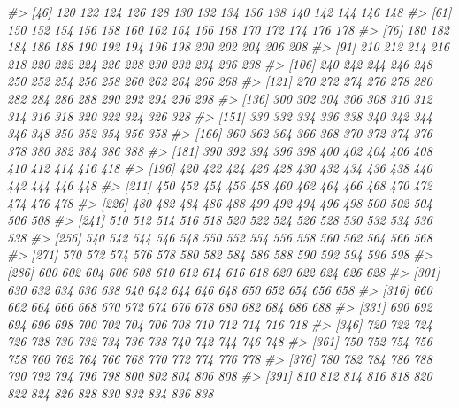 \documentclass[
]{article}
\newenvironment{Shaded}{\begin{snugshade}}{\end{snugshade}}
\newcommand{\CommentTok}[1]{\textcolor[rgb]{0.56,0.35,0.01}{\textit{#1}}}
\begin{document}
\begin{Shaded}
\begin{Highlighting}[]
\CommentTok{\#\textgreater{}  [46]  120  122  124  126  128  130  132  134  136  138  140  142  144  146  148}
\CommentTok{\#\textgreater{}  [61]  150  152  154  156  158  160  162  164  166  168  170  172  174  176  178}
\CommentTok{\#\textgreater{}  [76]  180  182  184  186  188  190  192  194  196  198  200  202  204  206  208}
\CommentTok{\#\textgreater{}  [91]  210  212  214  216  218  220  222  224  226  228  230  232  234  236  238}
\CommentTok{\#\textgreater{} [106]  240  242  244  246  248  250  252  254  256  258  260  262  264  266  268}
\CommentTok{\#\textgreater{} [121]  270  272  274  276  278  280  282  284  286  288  290  292  294  296  298}
\CommentTok{\#\textgreater{} [136]  300  302  304  306  308  310  312  314  316  318  320  322  324  326  328}
\CommentTok{\#\textgreater{} [151]  330  332  334  336  338  340  342  344  346  348  350  352  354  356  358}
\CommentTok{\#\textgreater{} [166]  360  362  364  366  368  370  372  374  376  378  380  382  384  386  388}
\CommentTok{\#\textgreater{} [181]  390  392  394  396  398  400  402  404  406  408  410  412  414  416  418}
\CommentTok{\#\textgreater{} [196]  420  422  424  426  428  430  432  434  436  438  440  442  444  446  448}
\CommentTok{\#\textgreater{} [211]  450  452  454  456  458  460  462  464  466  468  470  472  474  476  478}
\CommentTok{\#\textgreater{} [226]  480  482  484  486  488  490  492  494  496  498  500  502  504  506  508}
\CommentTok{\#\textgreater{} [241]  510  512  514  516  518  520  522  524  526  528  530  532  534  536  538}
\CommentTok{\#\textgreater{} [256]  540  542  544  546  548  550  552  554  556  558  560  562  564  566  568}
\CommentTok{\#\textgreater{} [271]  570  572  574  576  578  580  582  584  586  588  590  592  594  596  598}
\CommentTok{\#\textgreater{} [286]  600  602  604  606  608  610  612  614  616  618  620  622  624  626  628}
\CommentTok{\#\textgreater{} [301]  630  632  634  636  638  640  642  644  646  648  650  652  654  656  658}
\CommentTok{\#\textgreater{} [316]  660  662  664  666  668  670  672  674  676  678  680  682  684  686  688}
\CommentTok{\#\textgreater{} [331]  690  692  694  696  698  700  702  704  706  708  710  712  714  716  718}
\CommentTok{\#\textgreater{} [346]  720  722  724  726  728  730  732  734  736  738  740  742  744  746  748}
\CommentTok{\#\textgreater{} [361]  750  752  754  756  758  760  762  764  766  768  770  772  774  776  778}
\CommentTok{\#\textgreater{} [376]  780  782  784  786  788  790  792  794  796  798  800  802  804  806  808}
\CommentTok{\#\textgreater{} [391]  810  812  814  816  818  820  822  824  826  828  830  832  834  836  838}

\end{Highlighting}
\end{Shaded}
\end{document}
